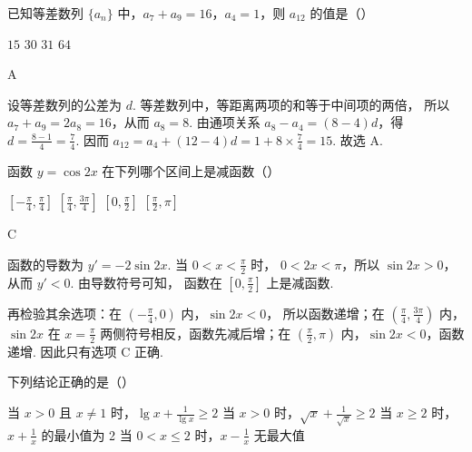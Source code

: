 \begin{problem}
已知等差数列 \(\{a_{n}\}\) 中，\(a_{7} + a_{9} = 16\)，\(a_{4} = 1\)，则 \(a_{12}\) 的值是（\quad）

\choices
    {\(15\)}
    {\(30\)}
    {\(31\)}
    {\(64\)}
\end{problem}

\begin{answer}
A
\end{answer}

\begin{solution}
设等差数列的公差为 \(d\). 等差数列中，等距离两项的和等于中间项的两倍，
所以 \(a_{7}+a_{9}=2a_{8}=16\)，从而 \(a_{8}=8\). 由通项关系
\(a_{8}-a_{4}=(8-4)d\)，得
\(d=\frac{8-1}{4}=\frac{7}{4}\). 因而
\(a_{12}=a_{4}+(12-4)d=1+8\times\frac{7}{4}=15\). 故选 A.
\end{solution}

\begin{problem}
函数 \( y = \cos 2x \) 在下列哪个区间上是减函数（\quad）

\choices
    {\(\left[-\frac{\pi}{4}, \frac{\pi}{4}\right]\)}
    {\(\left[\frac{\pi}{4}, \frac{3\pi}{4}\right]\)}
    {\(\left[0, \frac{\pi}{2}\right]\)}
    {\(\left[\frac{\pi}{2}, \pi\right]\)}
\end{problem}

\begin{answer}
C
\end{answer}

\begin{solution}
函数的导数为 \(y'=-2\sin2x\). 当 \(0<x<\frac{\pi}{2}\) 时，
\(0<2x<\pi\)，所以 \(\sin2x>0\)，从而 \(y'<0\). 由导数符号可知，
函数在 \(\left[0,\frac{\pi}{2}\right]\) 上是减函数.

再检验其余选项：在 \(\left(-\frac{\pi}{4},0\right)\) 内，\(\sin2x<0\)，
所以函数递增；在 \(\left(\frac{\pi}{4},\frac{3\pi}{4}\right)\) 内，
\(\sin2x\) 在 \(x=\frac{\pi}{2}\) 两侧符号相反，函数先减后增；在
\(\left(\frac{\pi}{2},\pi\right)\) 内，\(\sin2x<0\)，函数递增. 因此只有选项 C 正确.
\end{solution}

\begin{problem}
下列结论正确的是（\quad）

\choices
    {当 \(x > 0\) 且 \(x \neq 1\) 时，\(\lg x + \frac{1}{\lg x} \geqslant 2\)}
    {当 \(x > 0\) 时，\(\sqrt{x} + \frac{1}{\sqrt{x}} \geqslant 2\)}
    {当 \(x \geqslant 2\) 时，\(x + \frac{1}{x}\) 的最小值为 2}
    {当 \(0 < x \leqslant 2\) 时，\(x - \frac{1}{x}\) 无最大值}
\end{problem}

